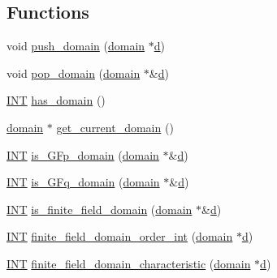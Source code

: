 \subsection*{Functions}
\begin{DoxyCompactItemize}
\item 
void \mbox{\hyperlink{domain_8_c_a73ae34a3de396002ddf3058ff7ffc1ec}{push\+\_\+domain}} (\mbox{\hyperlink{classdomain}{domain}} $\ast$\mbox{\hyperlink{simeon_8_c_a4339ca06fa882e69473d37bd6d7917d1}{d}})
\item 
void \mbox{\hyperlink{domain_8_c_a027eabe47e9f5305f32b0328275ac612}{pop\+\_\+domain}} (\mbox{\hyperlink{classdomain}{domain}} $\ast$\&\mbox{\hyperlink{simeon_8_c_a4339ca06fa882e69473d37bd6d7917d1}{d}})
\item 
\mbox{\hyperlink{galois_8h_a09fddde158a3a20bd2dcadb609de11dc}{I\+NT}} \mbox{\hyperlink{domain_8_c_af7df1c554310c6214b2900bf6ca7ac81}{has\+\_\+domain}} ()
\item 
\mbox{\hyperlink{classdomain}{domain}} $\ast$ \mbox{\hyperlink{domain_8_c_a80481fde3a59aaeeb648f8c5392269f7}{get\+\_\+current\+\_\+domain}} ()
\item 
\mbox{\hyperlink{galois_8h_a09fddde158a3a20bd2dcadb609de11dc}{I\+NT}} \mbox{\hyperlink{domain_8_c_ab75527270302df466fc6f6e355775c13}{is\+\_\+\+G\+Fp\+\_\+domain}} (\mbox{\hyperlink{classdomain}{domain}} $\ast$\&\mbox{\hyperlink{simeon_8_c_a4339ca06fa882e69473d37bd6d7917d1}{d}})
\item 
\mbox{\hyperlink{galois_8h_a09fddde158a3a20bd2dcadb609de11dc}{I\+NT}} \mbox{\hyperlink{domain_8_c_af695b4599bda7a0400772172c9eeff64}{is\+\_\+\+G\+Fq\+\_\+domain}} (\mbox{\hyperlink{classdomain}{domain}} $\ast$\&\mbox{\hyperlink{simeon_8_c_a4339ca06fa882e69473d37bd6d7917d1}{d}})
\item 
\mbox{\hyperlink{galois_8h_a09fddde158a3a20bd2dcadb609de11dc}{I\+NT}} \mbox{\hyperlink{domain_8_c_a77d0ace35941cfe84035c9a060972b2a}{is\+\_\+finite\+\_\+field\+\_\+domain}} (\mbox{\hyperlink{classdomain}{domain}} $\ast$\&\mbox{\hyperlink{simeon_8_c_a4339ca06fa882e69473d37bd6d7917d1}{d}})
\item 
\mbox{\hyperlink{galois_8h_a09fddde158a3a20bd2dcadb609de11dc}{I\+NT}} \mbox{\hyperlink{domain_8_c_a377eb55f39803977750d92e3eaf7af26}{finite\+\_\+field\+\_\+domain\+\_\+order\+\_\+int}} (\mbox{\hyperlink{classdomain}{domain}} $\ast$\mbox{\hyperlink{simeon_8_c_a4339ca06fa882e69473d37bd6d7917d1}{d}})
\item 
\mbox{\hyperlink{galois_8h_a09fddde158a3a20bd2dcadb609de11dc}{I\+NT}} \mbox{\hyperlink{domain_8_c_aa297182dc4e7a937102162ef666e23df}{finite\+\_\+field\+\_\+domain\+\_\+characteristic}} (\mbox{\hyperlink{classdomain}{domain}} $\ast$\mbox{\hyperlink{simeon_8_c_a4339ca06fa882e69473d37bd6d7917d1}{d}})

\end{DoxyCompactItemize}
